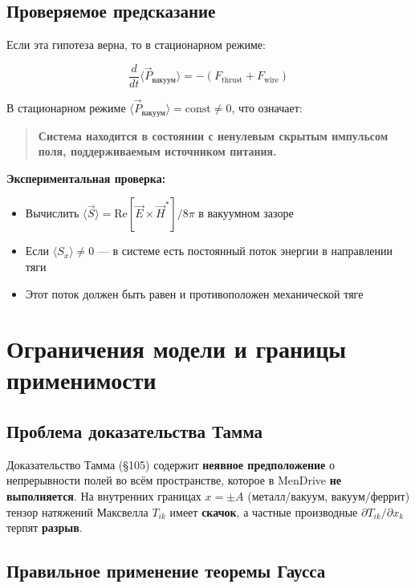 \documentclass[a4paper,12pt]{article}
\begin{document}
\subsection{Проверяемое предсказание}

Если эта гипотеза верна, то в стационарном режиме:

\begin{equation}
\frac{d}{dt} \langle \vec{P}_{\text{вакуум}} \rangle = - (F_{\text{thrust}} +
F_{\text{wire}})
\label{eq:testable_prediction}
\end{equation}

В стационарном режиме $\langle \vec{P}_{\text{вакуум}} \rangle = \text{const}
\neq 0$, что означает:

\begin{quote}
\textbf{Система находится в состоянии с ненулевым скрытым импульсом поля,
поддерживаемым источником питания.}
\end{quote}

\textbf{Экспериментальная проверка:}
\begin{itemize}
    \item Вычислить $\langle \vec{S} \rangle = \text{Re}[\vec{E} \times
    \vec{H}^*]/8\pi$ в вакуумном зазоре
    \item Если $\langle S_x \rangle \neq 0$ --- в системе есть постоянный поток
    энергии в направлении тяги
    \item Этот поток должен быть равен и противоположен механической тяге
\end{itemize}


\section{Ограничения модели и границы применимости}

\subsection{Проблема доказательства Тамма}

Доказательство Тамма (\S 105) содержит \textbf{неявное предположение} о
непрерывности полей во всём пространстве, которое в MenDrive
\textbf{не выполняется}. На внутренних границах $x = \pm A$ (металл/вакуум,
вакуум/феррит) тензор натяжений Максвелла $T_{ik}$ имеет \textbf{скачок},
а частные производные $\partial T_{ik}/\partial x_k$ терпят
\textbf{разрыв}.

\subsection{Правильное применение теоремы Гаусса}
\end{document}
